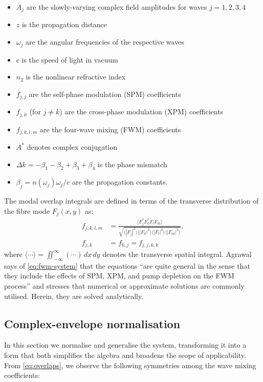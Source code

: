 \documentclass[11pt,a4paper]{article}
\begin{document}
\begin{itemize}
    \item $A_j$ are the slowly-varying complex field amplitudes for waves $j = 1, 2, 3, 4$
    \item $z$ is the propagation distance
    \item $\omega_j$ are the angular frequencies of the respective waves
    \item $c$ is the speed of light in vacuum
    \item $n_2$ is the nonlinear refractive index
    \item $f_{j,j}$ are the self-phase modulation (SPM) coefficients
    \item $f_{j,k}$ (for $j \neq k$) are the cross-phase modulation (XPM) coefficients
    \item $f_{j,k,l,m}$ are the four-wave mixing (FWM) coefficients
    \item $A^*$ denotes complex conjugation
    \item $\Delta k = -\beta_1 - \beta_2 + \beta_3 + \beta_4$ is the phase mismatch
    \item $\beta_j = n(\omega_j)\omega_j/c$ are the propagation constants.
\end{itemize}
The modal overlap integrals are defined in terms of the transverse distribution of the fibre mode $F_j(x,y)$ as:
\begin{align}
\label{eq:overlaps}
f_{j,k,l,m} &= \frac{\langle F_j^* F_k^* F_l F_m \rangle}{\sqrt{\langle |F_j|^2 \rangle \langle |F_k|^2 \rangle \langle |F_l|^2 \rangle \langle |F_m|^2 \rangle}}, \\
f_{j,k} &= f_{k,j} = f_{j,j,k,k}
\end{align}
where $\langle \cdots \rangle = \iint_{-\infty}^{\infty} (\cdots) \, dx\,dy$ denotes the transverse spatial integral. Agrawal says of \eqref{eq:fwm-system} that the equations ``are quite general in the sense that they include the effects of SPM, XPM, and pump depletion on the FWM process'' and stresses that numerical or approximate solutions are commonly utilised.
Herein, they are solved analytically.



\subsection{Complex-envelope normalisation}
In this section we normalise and generalise the system, transforming it into a form that both simplifies the algebra and broadens the scope of applicability.
From \eqref{eq:overlaps}, we observe the following symmetries among the wave mixing coefficients:
\end{document}
